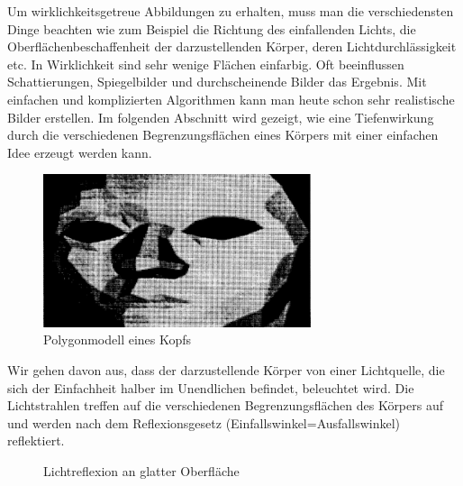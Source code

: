 \documentclass[%
11pt,%
twoside,%
titlepage,%
german,%
headsepline%
]{scrartcl}
\begin{document}
Um wirklichkeitsgetreue Abbildungen zu erhalten, muss man die verschiedensten Dinge beachten wie zum Beispiel die Richtung des einfallenden Lichts, die Ober\-flä\-chen\-be\-schaf\-fen\-heit der darzustellenden Körper, deren Licht\-durch\-läs\-sig\-keit etc. In Wirklichkeit sind sehr wenige Flächen einfarbig. Oft beeinflussen Schattierungen, Spiegelbilder und durchscheinende Bilder das Ergebnis. Mit einfachen und komplizierten Algorithmen kann man heute schon sehr realistische Bilder erstellen. Im folgenden Abschnitt wird gezeigt, wie eine Tiefenwirkung durch die verschiedenen Be\-gren\-zungs\-flächen eines Körpers mit einer einfachen Idee erzeugt werden kann.

\begin{figure}
\begin{center}
\includegraphics[width=0.7\textwidth]{pictures/pcgrafik}
\end{center}
\caption{Polygonmodell eines Kopfs}
\end{figure}

Wir gehen davon aus, dass der darzustellende Körper von einer Lichtquelle, die sich der Einfachheit halber im Unendlichen befindet, beleuchtet wird. Die Lichtstrahlen treffen auf die verschiedenen Begrenzungsflächen des Körpers auf und werden nach dem Reflexionsgesetz (Einfallswinkel=Ausfallswinkel) reflektiert.

\begin{figure}
\begin{center}
\end{center}
\caption{Lichtreflexion an glatter Oberfläche}
\end{figure}
\end{document}
